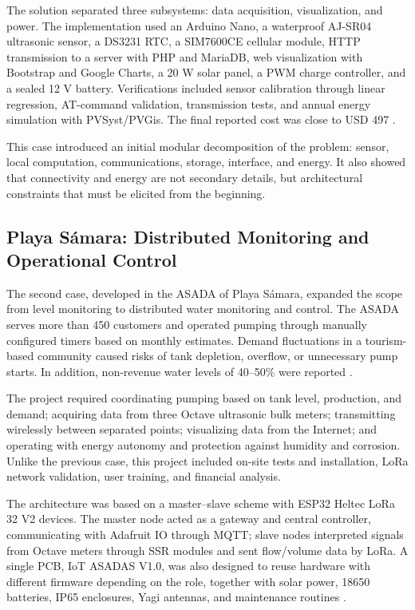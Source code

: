 \documentclass[conference]{IEEEtran}
\begin{document}
The solution separated three subsystems: data acquisition, visualization, and power. The implementation used an Arduino Nano, a waterproof AJ-SR04 ultrasonic sensor, a DS3231 RTC, a SIM7600CE cellular module, HTTP transmission to a server with PHP and MariaDB, web visualization with Bootstrap and Google Charts, a 20 W solar panel, a PWM charge controller, and a sealed 12 V battery. Verifications included sensor calibration through linear regression, AT-command validation, transmission tests, and annual energy simulation with PVSyst/PVGis. The final reported cost was close to USD 497 \cite{Chavarria2021}.

This case introduced an initial modular decomposition of the problem: sensor, local computation, communications, storage, interface, and energy. It also showed that connectivity and energy are not secondary details, but architectural constraints that must be elicited from the beginning.

\subsection{Playa Sámara: Distributed Monitoring and Operational Control}
The second case, developed in the ASADA of Playa Sámara, expanded the scope from level monitoring to distributed water monitoring and control. The ASADA serves more than 450 customers and operated pumping through manually configured timers based on monthly estimates. Demand fluctuations in a tourism-based community caused risks of tank depletion, overflow, or unnecessary pump starts. In addition, non-revenue water levels of 40--50\% were reported \cite{Solorzano2021}.

The project required coordinating pumping based on tank level, production, and demand; acquiring data from three Octave ultrasonic bulk meters; transmitting wirelessly between separated points; visualizing data from the Internet; and operating with energy autonomy and protection against humidity and corrosion. Unlike the previous case, this project included on-site tests and installation, LoRa network validation, user training, and financial analysis.

The architecture was based on a master--slave scheme with ESP32 Heltec LoRa 32 V2 devices. The master node acted as a gateway and central controller, communicating with Adafruit IO through MQTT; slave nodes interpreted signals from Octave meters through SSR modules and sent flow/volume data by LoRa. A single PCB, IoT ASADAS V1.0, was also designed to reuse hardware with different firmware depending on the role, together with solar power, 18650 batteries, IP65 enclosures, Yagi antennas, and maintenance routines \cite{Solorzano2021}.
\end{document}
